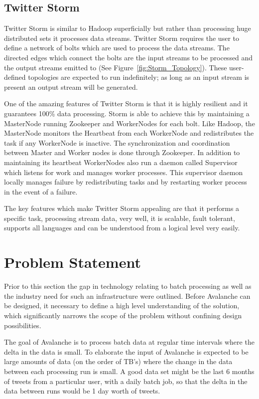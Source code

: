 \documentclass[a4paper]{article}
\begin{document}
\subsection{Twitter Storm}
Twitter Storm is similar to Hadoop superficially but rather than processing huge distributed sets it processes data streams.  Twitter Storm requires the user to define a network of bolts which are used to process the data streams.  The directed edges which connect the bolts are the input streams to be processed and the output streams emitted to (See Figure~\ref{fig:Storm_Topology}).  These user-defined topologies are expected to run indefinitely; as long as an input stream is present an output stream will be generated. 

One of the amazing features of Twitter Storm is that it is highly resilient and it guarantees 100\% data processing. Storm is able to achieve this by maintaining a MasterNode running Zookeeper and WorkerNodes for each bolt.  Like Hadoop, the MasterNode monitors the Heartbeat from each WorkerNode and redistributes the task if any WorkerNode is inactive. The synchronization and coordination between Master and Worker nodes is done through Zookeeper.  In addition to maintaining its heartbeat WorkerNodes also run a daemon called Supervisor which listens for work and manages worker processes.  This supervisor daemon locally manages failure by redistributing tasks and by restarting worker process in the event of a failure.  

The key features which make Twitter Storm appealing are that it performs a specific task, processing stream data, very well, it is scalable, fault tolerant, supports all languages and can be understood from a logical level very easily.  

\section{Problem Statement}
Prior to this section the gap in technology relating to batch processing as well as the industry need for such an infrastructure were outlined.  Before Avalanche can be designed, it necessary to define a high level understanding of the solution, which significantly narrows the scope of the problem without confining design possibilities.  

The goal of Avalanche is to process batch data at regular time intervals where the delta in the data is small.  To elaborate the input of Avalanche is expected to be large amounts of data (on the order of TB's) where the change in the data between each processing run is small.  A good data set might be the last 6 months of tweets from a particular user, with a daily batch job, so that the delta in the data between runs would be 1 day worth of tweets. 
\end{document}
